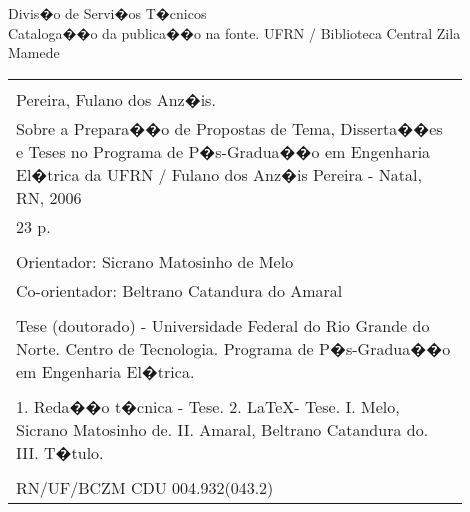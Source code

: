 %
%

\newpage

\begin{center}

\vspace*{\fill}

Divis�o de Servi�os T�cnicos\\[1ex]
Cataloga��o da publica��o na fonte.
UFRN / Biblioteca Central Zila Mamede

\vspace{2ex}

\begin{tabular}{|p{0.9\linewidth}|} \hline
\\
Pereira, Fulano dos Anz�is.\\
\hspace{1em} Sobre a Prepara��o de Propostas de Tema, Disserta��es
e Teses no Programa de P�s-Gradua��o em Engenharia El�trica da UFRN /
Fulano dos Anz�is Pereira - Natal, RN, 2006 \\
\hspace{1em} 23 p. \\
\\
\hspace{1em} Orientador: Sicrano Matosinho de Melo \\
\hspace{1em} Co-orientador: Beltrano Catandura do Amaral \\
\\
\hspace{1em} Tese (doutorado) - Universidade Federal do Rio Grande do Norte.
Centro de Tecnologia. Programa de P�s-Gradua��o em Engenharia El�trica. \\
\\
\hspace{1em} 1. Reda��o t�cnica - Tese. 2. \LaTeX - Tese.
I. Melo, Sicrano Matosinho de. II. Amaral, Beltrano Catandura do.
III. T�tulo. \\
\\
RN/UF/BCZM \hfill CDU 004.932(043.2) \\ \hline
\end{tabular} 

\end{center}
